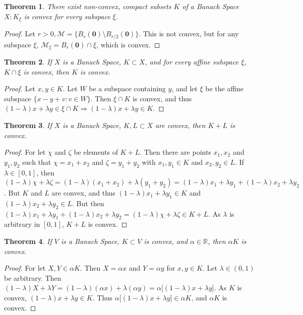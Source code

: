 \documentclass[oneside]{book}
\newtheorem{theorem}{Theorem}[section]
\theoremstyle{definition}
\newcommand*\B[1]{\mathbf{#1}}
\begin{document}
\begin{theorem}
There exist non-convex, compact subsets $K$ of a Banach Space $X: K_{\xi}$ is convex for every subspace $\xi$.
\end{theorem}
\begin{proof}
Let $r>0, \mathcal{M} = \{B_{r}(\B{0})\setminus B_{r/2}(\B{0})\}$. This is not convex, but for any subspace $\xi$, $\mathcal{M}_{\xi} = B_{r}(\B{0})\cap \xi$, which is convex.
\end{proof}

\begin{theorem}
If $X$ is a Banach Space, $K\subset X$, and for every affine subspace $\xi$, $K\cap \xi$ is convex, then $K$ is convex.
\end{theorem}
\begin{proof}
Let $x,y\in K$. Let $W$ be a subspace containing $y$, and let $\xi$ be the affine subspace $\{x-y+v:v\in W\}$. Then $\xi\cap K$ is convex, and thus $(1-\lambda)x+\lambda y \in \xi \cap K \Rightarrow (1-\lambda)x+\lambda y \in K$.
\end{proof}

\begin{theorem}
If $X$ is a Banach Space, $K,L\subset X$ are convex, then $K+L$ is convex.
\end{theorem}
\begin{proof}
For let $\chi$ and $\zeta$ be elements of $K+L$. Then there are points $x_1,x_2$ and $y_1,y_2$ such that $\chi=x_1+x_2$ and $\zeta = y_1+y_2$ with $x_1,y_1\in K$ and $x_2,y_2\in L$. If $\lambda \in [0,1]$, then $(1-\lambda)\chi + \lambda \zeta = (1-\lambda)(x_1+x_2)+\lambda(y_1+y_2) = (1-\lambda)x_1 + \lambda y_1 + (1-\lambda)x_2 + \lambda y_2$. But $K$ and $L$ are convex, and thus $(1-\lambda)x_1 + \lambda y_1 \in K$ and $(1-\lambda)x_2 + \lambda y_2 \in L$. But then $(1-\lambda)x_1 + \lambda y_1 + (1-\lambda)x_2 + \lambda y_2=(1-\lambda)\chi + \lambda \zeta\in K+L$. As $\lambda$ is arbitrary in $[0,1]$, $K+L$ is convex.
\end{proof}

\begin{theorem}
If $V$ is a Banach Space, $K\subset V$ is convex, and $\alpha \in \mathbb{R}$, then $\alpha K$ is convex.
\end{theorem}
\begin{proof}
For let $X,Y\in \alpha K$. Then $X = \alpha x$ and $Y = \alpha y$ for $x,y\in K$. Let $\lambda \in (0,1)$ be arbitrary. Then $(1-\lambda)X+\lambda Y =(1-\lambda)(\alpha x)+\lambda (\alpha y) = \alpha\big[(1-\lambda)x+\lambda y\big]$. As $K$ is convex, $(1-\lambda)x+\lambda y \in K$. Thus $\alpha\big[(1-\lambda)x+\lambda y\big] \in \alpha K$, and $\alpha K$ is convex.
\end{proof}
\end{document}
